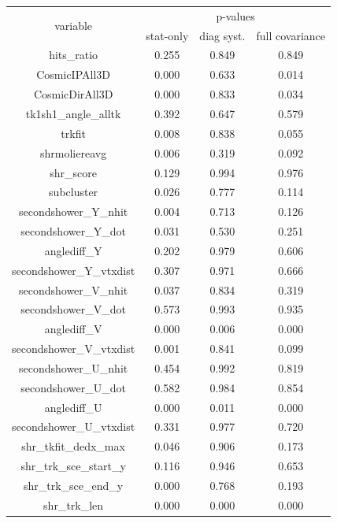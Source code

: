 \begin{table}[H]
\centering
\setlength{\tabcolsep}{10pt}
\renewcommand{\arraystretch}{1.25}
\begin{tabular}{| c | c | c | c | } 
 \hline
\multirow{2}{*}{variable} & \multicolumn{3}{c|}{p-values} \\
\cline{2-4} & stat-only & diag syst. & full covariance \\ \hline
hits\_ratio & 0.255 & 0.849 & 0.849 \\ \hline
CosmicIPAll3D & 0.000 & 0.633 & 0.014 \\ \hline
CosmicDirAll3D & 0.000 & 0.833 & 0.034 \\ \hline
tk1sh1\_angle\_alltk & 0.392 & 0.647 & 0.579 \\ \hline
trkfit & 0.008 & 0.838 & 0.055 \\ \hline
shrmoliereavg & 0.006 & 0.319 & 0.092 \\ \hline
shr\_score & 0.129 & 0.994 & 0.976 \\ \hline
subcluster & 0.026 & 0.777 & 0.114 \\ \hline
secondshower\_Y\_nhit & 0.004 & 0.713 & 0.126 \\ \hline
secondshower\_Y\_dot & 0.031 & 0.530 & 0.251 \\ \hline
anglediff\_Y & 0.202 & 0.979 & 0.606 \\ \hline
secondshower\_Y\_vtxdist & 0.307 & 0.971 & 0.666 \\ \hline
secondshower\_V\_nhit & 0.037 & 0.834 & 0.319 \\ \hline
secondshower\_V\_dot & 0.573 & 0.993 & 0.935 \\ \hline
anglediff\_V & 0.000 & 0.006 & 0.000 \\ \hline
secondshower\_V\_vtxdist & 0.001 & 0.841 & 0.099 \\ \hline
secondshower\_U\_nhit & 0.454 & 0.992 & 0.819 \\ \hline
secondshower\_U\_dot & 0.582 & 0.984 & 0.854 \\ \hline
anglediff\_U & 0.000 & 0.011 & 0.000 \\ \hline
secondshower\_U\_vtxdist & 0.331 & 0.977 & 0.720 \\ \hline
shr\_tkfit\_dedx\_max & 0.046 & 0.906 & 0.173 \\ \hline
shr\_trk\_sce\_start\_y & 0.116 & 0.946 & 0.653 \\ \hline
shr\_trk\_sce\_end\_y & 0.000 & 0.768 & 0.193 \\ \hline
shr\_trk\_len & 0.000 & 0.000 & 0.000 \\ \hline

\end{tabular}
\end{table}
